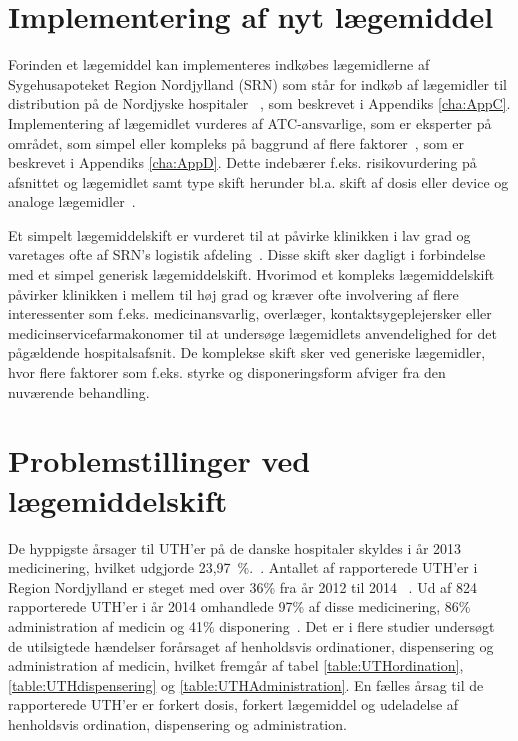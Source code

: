 \section{Implementering af nyt lægemiddel}
Forinden et lægemiddel kan implementeres indkøbes lægemidlerne af Sygehusapoteket Region Nordjylland (SRN) som står for indkøb af lægemidler til distribution på de Nordjyske hospitaler ~\citep{SygehusapoteketRegionNordjylland2013}, som beskrevet i Appendiks \ref{cha:AppC}. Implementering af lægemidlet vurderes af ATC-ansvarlige, som er eksperter på området, som simpel eller kompleks på baggrund af flere faktorer~\citep{Sygehusapoteket2017}, som er beskrevet i Appendiks \ref{cha:AppD}. Dette indebærer f.eks. risikovurdering på afsnittet og lægemidlet samt type skift herunder bl.a. skift af dosis eller device og analoge lægemidler~\citep{Sygehusapoteket2017}. 

Et simpelt lægemiddelskift er vurderet til at påvirke klinikken i lav grad og varetages ofte af SRN's logistik afdeling~\citep{Laegemiddelinformaion2017, Sygehusapoteket2017a}. Disse skift sker dagligt i forbindelse med et simpel generisk lægemiddelskift. Hvorimod et kompleks lægemiddelskift påvirker klinikken i mellem til høj grad og kræver ofte involvering af flere interessenter som f.eks. medicinansvarlig, overlæger, kontaktsygeplejersker eller medicinservicefarmakonomer til at undersøge lægemidlets anvendelighed for det pågældende hospitalsafsnit. 
De komplekse skift sker ved generiske lægemidler, hvor flere faktorer som f.eks. styrke og disponeringsform afviger fra den nuværende behandling.~\citep{Laegemiddelinformaion2017,Sygehusapoteket2017a}

\section{Problemstillinger ved lægemiddelskift}
De hyppigste årsager til UTH'er på de danske hospitaler skyldes i år 2013 medicinering, hvilket udgjorde 23,97~\%.~\citep{Patientombuddet2013}. Antallet af rapporterede UTH'er i Region Nordjylland er steget med over 36\% fra år 2012 til 2014 ~\citep{Jensen2014}. Ud af 824 rapporterede UTH'er i år 2014 omhandlede 97\% af disse medicinering, 86\% administration af medicin og 41\% disponering~\citep{Jensen2014}. Det er i flere studier undersøgt de utilsigtede hændelser forårsaget af henholdsvis ordinationer, dispensering og administration af medicin, hvilket fremgår af tabel \ref{table:UTHordination}, \ref{table:UTHdispensering} og \ref{table:UTHAdministration}. En fælles årsag til de rapporterede UTH'er er forkert dosis, forkert lægemiddel og udeladelse af henholdsvis ordination, dispensering og administration.

